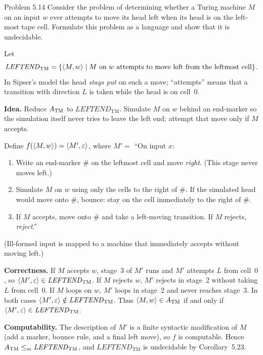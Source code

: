 \begin{question}{Problem 5.14}
Consider the problem of determining whether a Turing machine $M$ on an input $w$ ever attempts to move its head left when its head is on the left-most tape cell. Formulate this problem as a language and show that it is undecidable.
\end{question}
\begin{soln}
Let
\[
\mathit{LEFTEND}_{\mathrm{TM}}
=\{\langle M,w\rangle\mid\text{$M$ on $w$ attempts to move left from the leftmost cell}\}.
\]
In Sipser's model the head \emph{stays put} on such a move; ``attempts'' means that a transition with direction $L$ is taken while the head is on cell~$0$.

\textbf{Idea.} Reduce $A_{\mathrm{TM}}$ to $\mathit{LEFTEND}_{\mathrm{TM}}$. Simulate $M$ on $w$ behind an end-marker so the simulation itself never tries to leave the left end; attempt that move only if $M$ accepts.

Define $f(\langle M,w\rangle)=\langle M',\varepsilon\rangle$, where
$M'=$ ``On input $x$:
\begin{enumerate}
\item Write an end-marker $\#$ on the leftmost cell and move \emph{right}. (This stage never moves left.)
\item Simulate $M$ on $w$ using only the cells to the right of $\#$. If the simulated head would move onto $\#$, bounce: stay on the cell immediately to the right of $\#$.
\item If $M$ accepts, move onto $\#$ and take a left-moving transition. If $M$ rejects, \emph{reject}.''
\end{enumerate}
(Ill-formed input is mapped to a machine that immediately accepts without moving left.)

\textbf{Correctness.}
If $M$ accepts $w$, stage~3 of $M'$ runs and $M'$ attempts $L$ from cell~$0$, so $\langle M',\varepsilon\rangle\in\mathit{LEFTEND}_{\mathrm{TM}}$.
If $M$ rejects $w$, $M'$ rejects in stage~2 without taking $L$ from cell~$0$. If $M$ loops on $w$, $M'$ loops in stage~2 and never reaches stage~3. In both cases $\langle M',\varepsilon\rangle\notin\mathit{LEFTEND}_{\mathrm{TM}}$.
Thus $\langle M,w\rangle\in A_{\mathrm{TM}}$ if and only if $\langle M',\varepsilon\rangle\in\mathit{LEFTEND}_{\mathrm{TM}}$.

\textbf{Computability.} The description of $M'$ is a finite syntactic modification of $M$ (add a marker, bounce rule, and a final left move), so $f$ is computable. Hence $A_{\mathrm{TM}}\le_{m}\mathit{LEFTEND}_{\mathrm{TM}}$, and $\mathit{LEFTEND}_{\mathrm{TM}}$ is undecidable by Corollary~5.23.
\end{soln}

